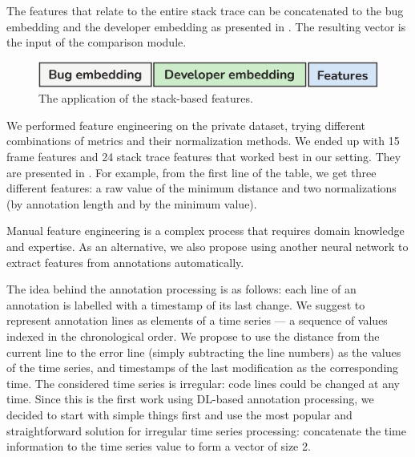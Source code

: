The features that relate to the entire stack trace can be concatenated to the bug embedding and the developer embedding as presented in . The resulting vector is the input of the comparison module. 
    
    \begin{figure}[htbp]
        \centering
        \includegraphics[width=\columnwidth]{figures/03-approach/overall-features.pdf}
        \vspace{-0.4cm}
        \centering
        \caption{The application of the stack-based features.}
        \label{fig:approach-overall-features}
    \end{figure}

We performed feature engineering on the private dataset, trying different combinations of metrics and their normalization methods. We ended up with 15 frame features and 24 stack trace features that worked best in our setting. They are presented in . 
For example, from the first line of the table, we get three different features: a raw value of the minimum distance and two normalizations (by annotation length and by the minimum value).

\label{sec:neural-features}

Manual feature engineering is a complex process that requires domain knowledge and expertise. As an alternative, we also propose using another neural network to extract features from annotations automatically.

The idea behind the annotation processing is as follows: each line of an annotation is labelled with a timestamp of its last change. We suggest to represent annotation lines as elements of a time series --- a sequence of values indexed in the chronological order. We propose to use the distance from the current line to the error line (simply subtracting the line numbers) as the values of the time series, and timestamps of the last modification as the corresponding time.
The considered time series is irregular: code lines could be changed at any time. 
Since this is the first work using DL-based annotation processing, we decided to start with simple things first and use the most popular and straightforward solution for irregular time series processing: concatenate the time information to the time series value to form a vector of size 2.

